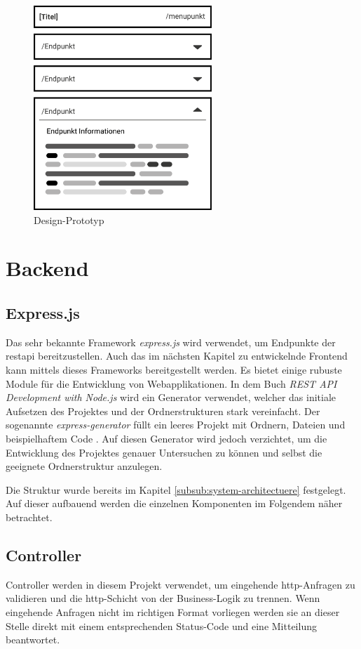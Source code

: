 \begin{figure}[h]
    \centering
    \includegraphics[width=0.6\textwidth]{figures/mock-up.png}
    \caption{Design-Prototyp}
    \label{fig:mock-up}
\end{figure}

\section{Backend} \label{sec:backend}

\subsection{Express.js}
Das sehr bekannte Framework \textit{express.js} wird verwendet, um Endpunkte der \gls{restapi} bereitzustellen. Auch das im nächsten Kapitel zu entwickelnde Frontend kann mittels dieses Frameworks bereitgestellt werden. Es bietet einige rubuste Module für die Entwicklung von Webapplikationen. In dem Buch \textit{REST API Development with Node.js} wird ein Generator verwendet, welcher das initiale Aufsetzen des Projektes und der Ordnerstrukturen stark vereinfacht. Der sogenannte \textit{express-generator} füllt ein leeres Projekt mit Ordnern, Dateien und beispielhaftem Code \cite{Doglio.2018}. Auf diesen Generator wird jedoch verzichtet, um die Entwicklung des Projektes genauer Untersuchen zu können und selbst die geeignete Ordnerstruktur anzulegen. 

Die Struktur wurde bereits im Kapitel \ref{subsub:system-architectuere} festgelegt. Auf dieser aufbauend werden die einzelnen Komponenten im Folgendem näher betrachtet.


\subsection{Controller}
Controller werden in diesem Projekt verwendet, um eingehende \gls{http}-Anfragen zu validieren und die \gls{http}-Schicht von der Business-Logik zu trennen. Wenn eingehende Anfragen nicht im richtigen Format vorliegen werden sie an dieser Stelle direkt mit einem entsprechenden Status-Code und eine Mitteilung beantwortet. 

